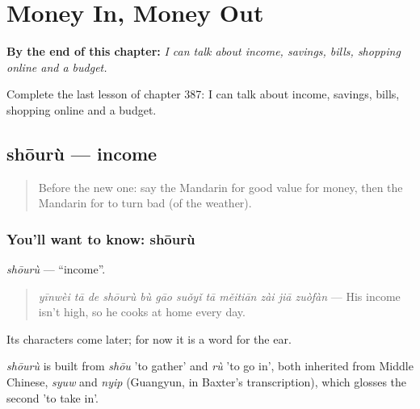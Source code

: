 
\chapter{Money In, Money Out}
\label{ch:zh-money-in-money-out}

\begin{chapteropening}
\textbf{By the end of this chapter:} \emph{I can talk about income, savings, bills, shopping online and a budget.}

Complete the last lesson of chapter 387: I can talk about income, savings, bills, shopping online and a budget.
\end{chapteropening}

\section[shōurù]{shōurù — income}

\label{lesson:ZH-C387-shouru}



\begin{quote}
Before the new one: say the Mandarin for good value for money, then the Mandarin for to turn bad (of the weather).
\end{quote}

\subsection*{You'll want to know: shōurù}
\emph{shōurù} — \textquotedblleft{}income\textquotedblright{}.

\begin{quote}
\emph{yīnwèi tā de shōurù bù gāo suǒyǐ tā měitiān zài jiā zuòfàn} — His income isn't high, so he cooks at home every day.
\end{quote}

Its characters come later; for now it is a word for the ear.

\begin{cousinweb}
\emph{shōurù} is built from \emph{shōu} 'to gather' and \emph{rù} 'to go in', both inherited from Middle Chinese, \emph{syuw} and \emph{nyip} (Guangyun, in Baxter's transcription), which glosses the second 'to take in'.
\end{cousinweb}

